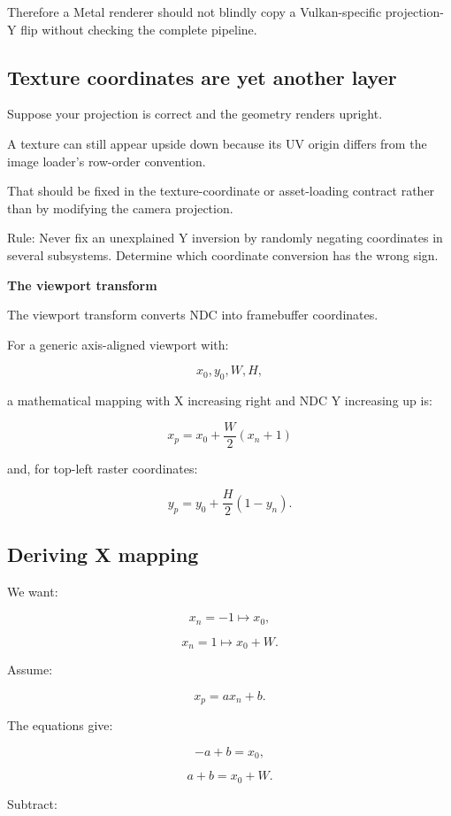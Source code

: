 Therefore a Metal renderer should not blindly copy a Vulkan-specific projection-Y flip without checking the complete pipeline.

\subsection{Texture coordinates are yet another layer}\label{02-foundations-ii-ch033-texture-coordinates-are-yet-another-layer}

Suppose your projection is correct and the geometry renders upright.

A texture can still appear upside down because its UV origin differs from the image loader's row-order convention.

That should be fixed in the texture-coordinate or asset-loading contract rather than by modifying the camera projection.

Rule: Never fix an unexplained Y inversion by randomly negating coordinates in several subsystems. Determine which coordinate conversion has the wrong sign.

\textbf{The viewport transform}

The viewport transform converts NDC into framebuffer coordinates.

For a generic axis-aligned viewport with:

\[
 x_0,y_0,W,H,
\]

a mathematical mapping with X increasing right and NDC Y increasing up is:

\[
 \boxed{ x_p=x_0+\frac W2(x_n+1) }
\]

and, for top-left raster coordinates:

\[
 \boxed{ y_p=y_0+\frac H2(1-y_n) }.
\]

\subsection{Deriving X mapping}\label{02-foundations-ii-ch033-deriving-x-mapping}

We want:

\[
 x_n=-1\mapsto x_0,
\]

\[
 x_n=1\mapsto x_0+W.
\]

Assume:

\[
 x_p=ax_n+b.
\]

The equations give:

\[
 -a+b=x_0,
\]

\[
 a+b=x_0+W.
\]

Subtract:

